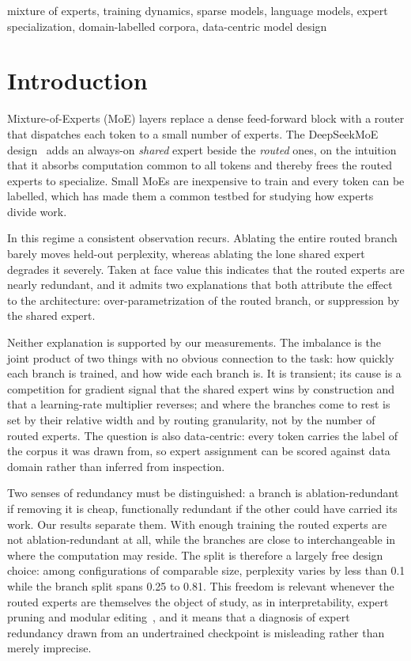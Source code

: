 \documentclass[conference,11pt]{IEEEtran}
\begin{document}
\begin{IEEEkeywords}
mixture of experts, training dynamics, sparse models, language models, expert specialization, domain-labelled corpora, data-centric model design
\end{IEEEkeywords}

\section{Introduction}

Mixture-of-Experts (MoE) layers replace a dense feed-forward block with a router that dispatches
each token to a small number of experts. The DeepSeekMoE design~\cite{dai2024deepseekmoe} adds an
always-on \emph{shared} expert beside the \emph{routed} ones, on the intuition that it absorbs
computation common to all tokens and thereby frees the routed experts to specialize. Small MoEs
are inexpensive to train and every token can be labelled, which has made them a common testbed for
studying how experts divide work.

In this regime a consistent observation recurs. Ablating the entire routed branch barely moves
held-out perplexity, whereas ablating the lone shared expert degrades it severely. Taken at face
value this indicates that the routed experts are nearly redundant, and it admits two explanations
that both attribute the effect to the architecture: over-parametrization of the routed branch, or
suppression by the shared expert.

Neither explanation is supported by our measurements. The imbalance is the joint product of two
things with no obvious connection to the task: how quickly each branch is trained, and how wide
each branch is. It is transient; its cause is a competition for gradient signal that the shared
expert wins by construction and that a learning-rate multiplier reverses; and where the branches
come to rest is set by their relative width and by routing granularity, not by the number of
routed experts. The question is also data-centric: every token carries the label of the corpus it
was drawn from, so expert assignment can be scored against data domain rather than inferred from
inspection.

Two senses of redundancy must be distinguished: a branch is ablation-redundant if removing it is
cheap, functionally redundant if the other could have carried its work. Our results separate them.
With enough training the routed experts are not ablation-redundant at all, while the branches are
close to interchangeable in where the computation may reside. The split is therefore a largely
free design choice: among configurations of comparable size, perplexity varies by less than 0.1
while the branch split spans 0.25 to 0.81. This freedom is relevant whenever the routed experts
are themselves the object of study, as in interpretability, expert pruning and modular
editing~\cite{muennighoff2024olmoe,lu2024notall}, and it means that a diagnosis of expert
redundancy drawn from an undertrained checkpoint is misleading rather than merely imprecise.
\end{document}
